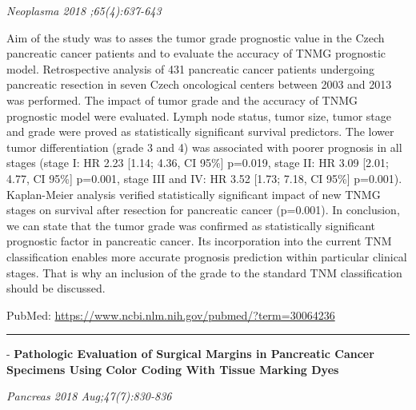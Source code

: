 \documentclass[]{article}
\begin{document}
\emph{Neoplasma 2018 ;65(4):637-643}

Aim of the study was to asses the tumor grade prognostic value in the
Czech pancreatic cancer patients and to evaluate the accuracy of TNMG
prognostic model. Retrospective analysis of 431 pancreatic cancer
patients undergoing pancreatic resection in seven Czech oncological
centers between 2003 and 2013 was performed. The impact of tumor grade
and the accuracy of TNMG prognostic model were evaluated. Lymph node
status, tumor size, tumor stage and grade were proved as statistically
significant survival predictors. The lower tumor differentiation (grade
3 and 4) was associated with poorer prognosis in all stages (stage I: HR
2.23 {[}1.14; 4.36, CI 95\%{]} p=0.019, stage II: HR 3.09 {[}2.01; 4.77,
CI 95\%{]} p=0.001, stage III and IV: HR 3.52 {[}1.73; 7.18, CI 95\%{]}
p=0.001). Kaplan-Meier analysis verified statistically significant
impact of new TNMG stages on survival after resection for pancreatic
cancer (p=0.001). In conclusion, we can state that the tumor grade was
confirmed as statistically significant prognostic factor in pancreatic
cancer. Its incorporation into the current TNM classification enables
more accurate prognosis prediction within particular clinical stages.
That is why an inclusion of the grade to the standard TNM classification
should be discussed.

PubMed: \url{https://www.ncbi.nlm.nih.gov/pubmed/?term=30064236}

{}

{}

\begin{center}\rule{0.5\linewidth}{\linethickness}\end{center}

 - \textbf{Pathologic Evaluation of Surgical Margins in Pancreatic
Cancer Specimens Using Color Coding With Tissue Marking Dyes}

\emph{Pancreas 2018 Aug;47(7):830-836}
\end{document}
